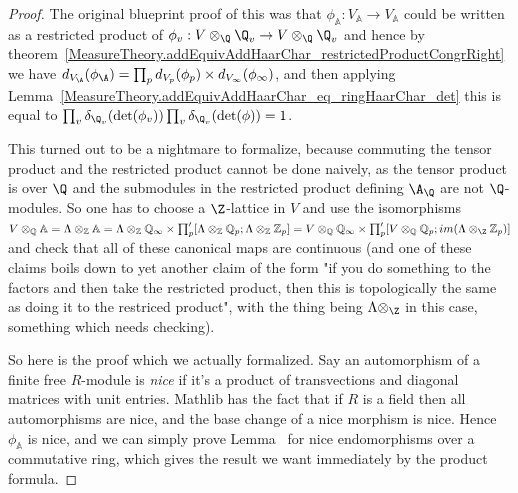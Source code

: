   \begin{proof}
    \leanok
    The original blueprint proof of this was that $\phi_{\mathbb{A}} : V_{\mathbb{A}}\to V_{\mathbb{A}}$
    could be written as a restricted product of $\phi_v:V\otimes_{\Q}{\Q_v} \to V\otimes_{\Q}\Q_v$
    and hence by theorem~\ref{MeasureTheory.addEquivAddHaarChar_restrictedProductCongrRight}
    we have $d_{V_{\A}}(\phi_{\A})=\prod_p d_{V_p}(\phi_p)\times d_{V_\infty}(\phi_\infty)$,
    and then applying Lemma~\ref{MeasureTheory.addEquivAddHaarChar_eq_ringHaarChar_det} this
    is equal to $\prod_v\delta_{\Q_v}(\det(\phi_v))\prod_v\delta_{\Q_v}(\det(\phi))=1$.

    This turned out to be a nightmare to formalize, because commuting the tensor product
    and the restricted product cannot be done naively, as the tensor product is over $\Q$
    and the submodules in the restricted product defining $\A_{\Q}$ are not $\Q$-modules.
    So one has to choose a $\Z$-lattice in $V$ and
    use the isomorphisms $V\otimes_{\mathbb{Q}}\mathbb{A}=\Lambda\otimes_{\mathbb{Z}}\mathbb{A}=
    \Lambda\otimes_{\mathbb{Z}}\mathbb{Q}_\infty\times\prod'_p[\Lambda\otimes_{\mathbb{Z}}\mathbb{Q}_p;\Lambda\otimes_{\mathbb{Z}}\mathbb{Z}_p]=
    V\otimes_{\mathbb{Q}}\mathbb{Q}_\infty\times\prod'_p[V\otimes_{\mathbb{Q}}\mathbb{Q}_p;im(\Lambda\otimes_{\Z}\mathbb{Z}_p)]$
    and check that all of these canonical maps are continuous (and one of these claims
    boils down to yet another claim of the form "if you do something to the factors and then
    take the restricted product, then this is topologically the same as doing it to the restriced product",
    with the thing being $\Lambda\otimes_{\Z}$ in this case, something which needs
    checking).

    So here is the proof which we actually formalized. Say an automorphism of a finite free
    $R$-module is \emph{nice} if it's a product of transvections and diagonal matrices with unit
    entries. Mathlib has the fact that if $R$ is a field then all automorphisms are nice,
    and the base change of a nice morphism is nice. Hence $\phi_{\mathbb{A}}$ is nice,
    and we can simply prove Lemma~\cite{MeasureTheory.addEquivAddHaarChar_eq_ringHaarChar_det}
    for nice endomorphisms over a commutative ring, which gives the result we want immediately
    by the product formula.
  \end{proof}

